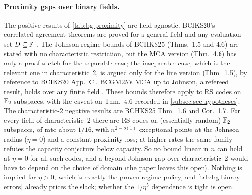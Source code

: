 \paragraph{Proximity gaps over binary fields.} The positive results of
\cref{tab:bg-proximity} are field-agnostic. BCIKS20's correlated-agreement theorems are proved
for a general field and any evaluation set $D\subseteq\mathbb{F}$ \cite{BCIKS20}. The Johnson-regime
bounds of BCHKS25 (Thms.~1.5 and 4.6) are stated with no characteristic restriction, but the MCA
version (Thm.~4.6) has only a proof sketch for the separable case; the inseparable case, which is
the relevant one in characteristic~2, is argued only for the line version (Thm.~1.5), by reference
to BCIKS20 App.~C \cite{BCHKS25}. BCGM25's MCA up to Johnson, a refereed result, holds over any
finite field \cite{BCGM25-MCA}. These bounds therefore apply to RS codes on $\mathbb{F}_2$-subspaces, with
the caveat on Thm.~4.6 recorded in \cref{subsec:sec-hypotheses}. The characteristic-2 negative
results are BCHKS25 Thm.~1.6 and Cor.~1.7. For every field of characteristic~2 there are RS codes
on (essentially random) $\mathbb{F}_2$-subspaces, of rate about $1/16$, with $n^{2-o(1)}$ exceptional points
at the Johnson radius ($\eta=0$) and a constant proximity loss; at higher rates the same family
refutes the capacity conjecture below capacity. So no bound linear in $n$ can hold at $\eta=0$ for
all such codes, and a beyond-Johnson gap over characteristic~2 would have to depend on the choice of
domain (the paper leaves this open). Nothing is implied for $\eta>0$, which is exactly the
proven-regime policy, and \cref{tab:bg-binary-errors} already prices the slack; whether the
$1/\eta^5$ dependence is tight is open.

